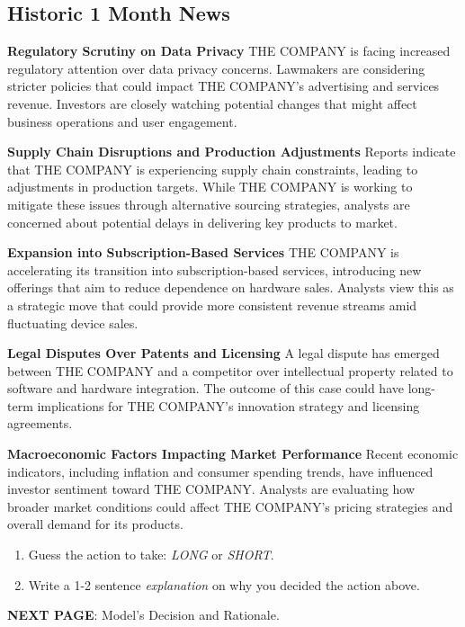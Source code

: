 \documentclass[8pt]{scrartcl}
\begin{document}
\subsection*{Historic 1 Month News}

\textbf{Regulatory Scrutiny on Data Privacy}
THE COMPANY is facing increased regulatory attention over data privacy concerns. Lawmakers are considering stricter policies that could impact THE COMPANY’s advertising and services revenue. Investors are closely watching potential changes that might affect business operations and user engagement.

\textbf{Supply Chain Disruptions and Production Adjustments}
Reports indicate that THE COMPANY is experiencing supply chain constraints, leading to adjustments in production targets. While THE COMPANY is working to mitigate these issues through alternative sourcing strategies, analysts are concerned about potential delays in delivering key products to market.

\textbf{Expansion into Subscription-Based Services}
THE COMPANY is accelerating its transition into subscription-based services, introducing new offerings that aim to reduce dependence on hardware sales. Analysts view this as a strategic move that could provide more consistent revenue streams amid fluctuating device sales.

\textbf{Legal Disputes Over Patents and Licensing}
A legal dispute has emerged between THE COMPANY and a competitor over intellectual property related to software and hardware integration. The outcome of this case could have long-term implications for THE COMPANY’s innovation strategy and licensing agreements.

\textbf{Macroeconomic Factors Impacting Market Performance}
Recent economic indicators, including inflation and consumer spending trends, have influenced investor sentiment toward THE COMPANY. Analysts are evaluating how broader market conditions could affect THE COMPANY’s pricing strategies and overall demand for its products.


\begin{tcolorbox}[colback=blue!10, colframe=blue!60, title=\textbf{TASKS}, sharp corners=southwest]
\begin{enumerate}
    \item Guess the action to take: \textit{LONG} or \textit{SHORT}.
    \item Write a 1-2 sentence \textit{explanation} on why you decided the action above.
\end{enumerate}
\end{tcolorbox}
\textbf{NEXT PAGE}: Model's Decision and Rationale.
\end{document}
